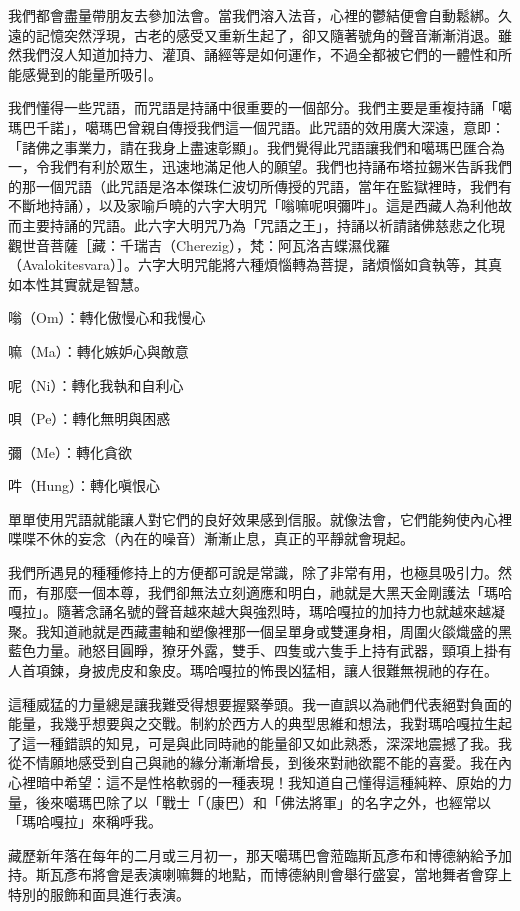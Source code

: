 我們都會盡量帶朋友去參加法會。當我們溶入法音，心裡的鬱結便會自動鬆綁。久遠的記憶突然浮現，古老的感受又重新生起了，卻又隨著號角的聲音漸漸消退。雖然我們沒人知道加持力、灌頂、誦經等是如何運作，不過全都被它們的一體性和所能感覺到的能量所吸引。

我們懂得一些咒語，而咒語是持誦中很重要的一個部分。我們主要是重複持誦「噶瑪巴千諾」，噶瑪巴曾親自傳授我們這一個咒語。此咒語的效用廣大深遠，意即：「諸佛之事業力，請在我身上盡速彰顯」。我們覺得此咒語讓我們和噶瑪巴匯合為一，令我們有利於眾生，迅速地滿足他人的願望。我們也持誦布塔拉錫米告訴我們的那一個咒語（此咒語是洛本傑珠仁波切所傳授的咒語，當年在監獄裡時，我們有不斷地持誦），以及家喻戶曉的六字大明咒「嗡嘛呢唄彌吽」。這是西藏人為利他故而主要持誦的咒語。此六字大明咒乃為「咒語之王」，持誦以祈請諸佛慈悲之化現觀世音菩薩［藏：千瑞吉（Cherezig），梵：阿瓦洛吉蝶濕伐羅（Avalokitesvara）］。六字大明咒能將六種煩惱轉為菩提，諸煩惱如貪執等，其真如本性其實就是智慧。

嗡（Om）：轉化傲慢心和我慢心

嘛（Ma）：轉化嫉妒心與敵意

呢（Ni）：轉化我執和自利心

唄（Pe）：轉化無明與困惑

彌（Me）：轉化貪欲

吽（Hung）：轉化嗔恨心

單單使用咒語就能讓人對它們的良好效果感到信服。就像法會，它們能夠使內心裡喋喋不休的妄念（內在的噪音）漸漸止息，真正的平靜就會現起。

我們所遇見的種種修持上的方便都可說是常識，除了非常有用，也極具吸引力。然而，有那麼一個本尊，我們卻無法立刻適應和明白，祂就是大黑天金剛護法「瑪哈嘎拉」。隨著念誦名號的聲音越來越大與強烈時，瑪哈嘎拉的加持力也就越來越凝聚。我知道祂就是西藏畫軸和塑像裡那一個呈單身或雙運身相，周圍火燄熾盛的黑藍色力量。祂怒目圓睜，獠牙外露，雙手、四隻或六隻手上持有武器，頸項上掛有人首項鍊，身披虎皮和象皮。瑪哈嘎拉的怖畏凶猛相，讓人很難無視祂的存在。

這種威猛的力量總是讓我難受得想要握緊拳頭。我一直誤以為祂們代表絕對負面的能量，我幾乎想要與之交戰。制約於西方人的典型思維和想法，我對瑪哈嘎拉生起了這一種錯誤的知見，可是與此同時祂的能量卻又如此熟悉，深深地震撼了我。我從不情願地感受到自己與祂的緣分漸漸增長，到後來對祂欲罷不能的喜愛。我在內心裡暗中希望：這不是性格軟弱的一種表現！我知道自己懂得這種純粹、原始的力量，後來噶瑪巴除了以「戰士「（康巴）和「佛法將軍」的名字之外，也經常以「瑪哈嘎拉」來稱呼我。

藏歷新年落在每年的二月或三月初一，那天噶瑪巴會蒞臨斯瓦彥布和博德納給予加持。斯瓦彥布將會是表演喇嘛舞的地點，而博德納則會舉行盛宴，當地舞者會穿上特別的服飾和面具進行表演。

